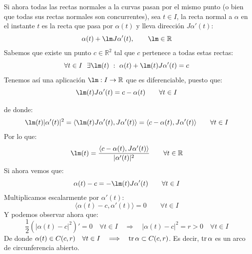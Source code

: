 \begin{ejercicio}
    \noindent
    Si ahora todas las rectas normales a la curvas pasan por el mismo punto (o bien que todas sus rectas normales son concurrentes), sea $t\in I$, la recta normal a $\alpha$ en el instante $t$ es la recta que pasa por $\alpha(t)$ y lleva dirección $J\alpha'(t)$:
    \begin{equation*}
        \alpha(t) + \lm J\alpha'(t), \qquad \lm \in \mathbb{R}
    \end{equation*}
    Sabemos que existe un punto $c\in \mathbb{R}^2$ tal que $c$ pertenece a todas estas rectas:
    \begin{equation*}
        \forall t\in I~~\exists \lm(t)~:~ \alpha(t) + \lm(t)J\alpha'(t) = c
    \end{equation*}
    Tenemos así una aplicación $\lm:I\to \mathbb{R}$ que es diferenciable, puesto que:
    \begin{equation*}
        \lm(t) J\alpha'(t) = c - \alpha(t) \qquad \forall t\in I
    \end{equation*}

    de donde:
    \begin{equation*}
        \lm(t) |\alpha'(t)|^2 = \langle \lm(t)J\alpha'(t),J\alpha'(t) \rangle  = \langle c-\alpha(t),J\alpha'(t) \rangle   \qquad \forall t\in I
    \end{equation*}
    Por lo que:
    \begin{equation*}
        \lm(t) = \frac{\langle c-\alpha(t),J\alpha'(t) \rangle }{|\alpha'(t)|^2} \qquad \forall t\in \mathbb{R}
    \end{equation*}
    Si ahora vemos que:
    \begin{equation*}
        \alpha(t)-c = -\lm(t)J\alpha'(t) \qquad \forall t\in I
    \end{equation*}
    Multiplicamos escalarmente por $\alpha'(t)$:
    \begin{equation*}
        \langle \alpha(t)-c,\alpha'(t) \rangle = 0 \qquad \forall t\in I
    \end{equation*}
    Y podemos observar ahora que:
    \begin{equation*}
        \frac{1}{2}(|\alpha(t)-c|^2)' = 0 \quad \forall t\in I \quad\Longrightarrow\quad|\alpha(t)-c|^2 = r> 0\quad \forall t\in I
    \end{equation*}
    De donde $\alpha(t)\in C(c,r)\quad \forall t\in I\quad\Longrightarrow\quad\operatorname{tr}\alpha\subset C(c,r)$. Es decir, $\operatorname{tr}\alpha$ es un arco de circunferencia abierto.
\end{ejercicio}

